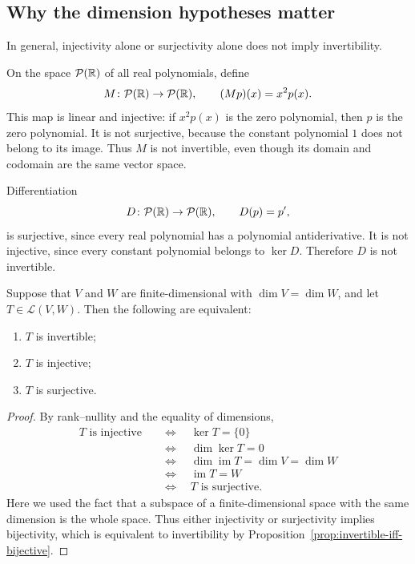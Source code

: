 \subsection{Why the dimension hypotheses matter}

In general, injectivity alone or surjectivity alone does not imply
invertibility.

\begin{example}
  On the space $\mathcal P(\mathbb{R})$ of all real polynomials, define
  \[
    M\colon\mathcal P(\mathbb{R})\to\mathcal P(\mathbb{R}),
    \qquad (Mp)(x)=x^2p(x).
  \]
  This map is linear and injective: if $x^2p(x)$ is the zero
  polynomial, then $p$ is the zero polynomial. It is not surjective,
  because the constant polynomial $1$ does not belong to its image.
  Thus $M$ is not invertible, even though its domain and codomain
  are the same vector space.
\end{example}

\begin{example}
  Differentiation
  \[
    D\colon\mathcal P(\mathbb{R})\to\mathcal P(\mathbb{R}),
    \qquad D(p)=p',
  \]
  is surjective, since every real polynomial has a polynomial
  antiderivative. It is not injective, since every constant polynomial
  belongs to $\ker D$. Therefore $D$ is not invertible.
\end{example}

\begin{proposition}\label{prop:equal-dimension-invertibility}
  Suppose that $V$ and $W$ are finite-dimensional with
  $\dim V=\dim W$, and let $T\in\mathcal L(V,W)$. Then the
  following are equivalent:
  \begin{enumerate}[label=(\roman*)]
    \item $T$ is invertible;
    \item $T$ is injective;
    \item $T$ is surjective.
  \end{enumerate}
\end{proposition}

\begin{proof}
  By rank--nullity and the equality of dimensions,
  \begin{align*}
    T\text{ is injective}
      &\quad\Longleftrightarrow\quad \ker T=\{0\} \\
      &\quad\Longleftrightarrow\quad \dim\ker T=0 \\
      &\quad\Longleftrightarrow\quad
        \dim\operatorname{im}T=\dim V=\dim W \\
      &\quad\Longleftrightarrow\quad \operatorname{im}T=W \\
      &\quad\Longleftrightarrow\quad T\text{ is surjective}.
  \end{align*}
  Here we used the fact that a subspace of a finite-dimensional space
  with the same dimension is the whole space. Thus either
  injectivity or surjectivity implies bijectivity, which is equivalent
  to invertibility by Proposition~\ref{prop:invertible-iff-bijective}.
\end{proof}

